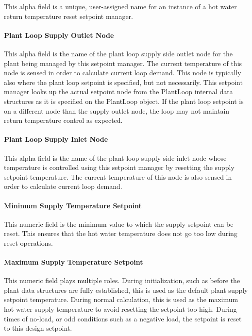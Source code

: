 This alpha field is a unique, user-assigned name for an instance of a hot water return temperature reset setpoint manager.

\paragraph{Plant Loop Supply Outlet Node}\label{plant-loop-supply-outlet-node-1}

This alpha field is the name of the plant loop supply side outlet node for the plant being managed by this setpoint manager. The current temperature of this node is sensed in order to calculate current loop demand. This node is typically also where the plant loop setpoint is specified, but not necessarily. This setpoint manager looks up the actual setpoint node from the PlantLoop internal data structures as it is specified on the PlantLoop object. If the plant loop setpoint is on a different node than the supply outlet node, the loop may not maintain return temperature control as expected.

\paragraph{Plant Loop Supply Inlet Node}\label{plant-loop-supply-inlet-node-1}

This alpha field is the name of the plant loop supply side inlet node whose temperature is controlled using this setpoint manager by resetting the supply setpoint temperature. The current temperature of this node is also sensed in order to calculate current loop demand.

\paragraph{Minimum Supply Temperature Setpoint}\label{minimum-supply-temperature-setpoint-1}

This numeric field is the minimum value to which the supply setpoint can be reset. This ensures that the hot water temperature does not go too low during reset operations.

\paragraph{Maximum Supply Temperature Setpoint}\label{maximum-supply-temperature-setpoint-1}

This numeric field plays multiple roles. During initialization, such as before the plant data structures are fully established, this is used as the default plant supply setpoint temperature. During normal calculation, this is used as the maximum hot water supply temperature to avoid resetting the setpoint too high. During times of no-load, or odd conditions such as a negative load, the setpoint is reset to this design setpoint.

